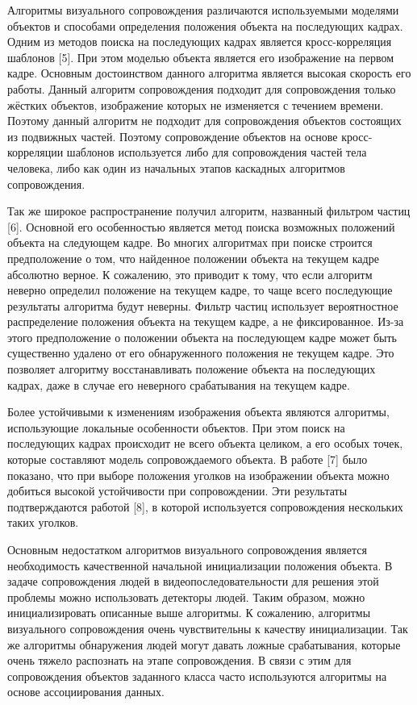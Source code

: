 Алгоритмы визуального сопровождения различаются используемыми моделями объектов и способами определения положения объекта на последующих кадрах. Одним из методов поиска на последующих кадрах является кросс-корреляция шаблонов [5]. При этом моделью объекта является его изображение на первом кадре. Основным достоинством данного алгоритма является высокая скорость его работы. Данный алгоритм сопровождения подходит для сопровождения только жёстких объектов, изображение которых не изменяется с течением времени. Поэтому данный алгоритм не подходит для сопровождения объектов состоящих из подвижных частей. Поэтому сопровождение объектов на основе кросс-корреляции шаблонов используется либо для сопровождения частей тела человека, либо как один из начальных этапов каскадных алгоритмов сопровождения.

Так же широкое распространение получил алгоритм, названный фильтром частиц [6]. Основной его особенностью является метод поиска возможных положений объекта на следующем кадре. Во многих алгоритмах при поиске строится предположение о том, что найденное положении объекта на текущем кадре абсолютно верное. К сожалению, это приводит к тому, что если алгоритм неверно определил положение на текущем кадре, то чаще всего последующие результаты алгоритма будут неверны. Фильтр частиц использует вероятностное распределение положения объекта на текущем кадре, а не фиксированное.  Из-за этого предположение о положении объекта на последующем кадре может быть существенно удалено от его обнаруженного положения не текущем кадре. Это позволяет алгоритму восстанавливать положение объекта на последующих кадрах, даже в случае его неверного срабатывания на текущем кадре. 

Более устойчивыми к изменениям изображения объекта являются алгоритмы, использующие локальные особенности объектов. При этом поиск на последующих кадрах происходит не всего объекта целиком, а его особых точек, которые составляют модель сопровождаемого объекта. В работе [7] было показано, что при выборе положения уголков на изображении объекта можно добиться высокой устойчивости при сопровождении. Эти результаты подтверждаются работой [8], в которой используется сопровождения нескольких таких уголков.

Основным недостатком алгоритмов визуального сопровождения является необходимость качественной начальной инициализации положения объекта. В задаче сопровождения людей в видеопоследовательности для решения этой проблемы можно использовать детекторы людей. Таким образом, можно инициализировать описанные выше алгоритмы. К сожалению, алгоритмы визуального сопровождения очень чувствительны к качеству инициализации. Так же алгоритмы обнаружения людей могут давать ложные срабатывания, которые очень тяжело распознать на этапе сопровождения. В связи с этим для сопровождения объектов заданного класса часто используются алгоритмы на основе ассоциирования данных.

